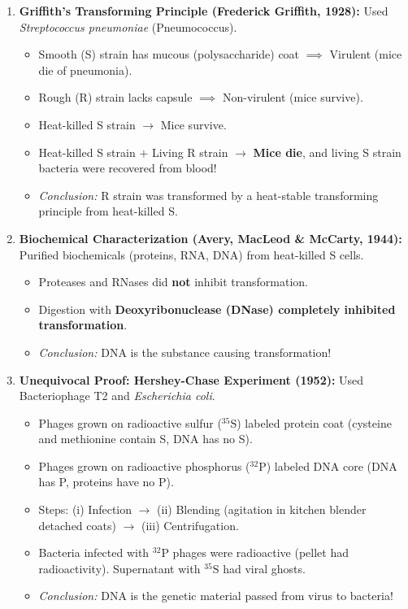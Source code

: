 \documentclass[10pt,a4paper]{article}
\begin{document}
\begin{conceptbox}
\begin{enumerate}[leftmargin=*]
  \item \textbf{Griffith's Transforming Principle (Frederick Griffith, 1928):}
  Used \textit{Streptococcus pneumoniae} (Pneumococcus).
  \begin{itemize}
    \item Smooth (S) strain has mucous (polysaccharide) coat $\implies$ Virulent (mice die of pneumonia).
    \item Rough (R) strain lacks capsule $\implies$ Non-virulent (mice survive).
    \item Heat-killed S strain $\to$ Mice survive.
    \item Heat-killed S strain $+$ Living R strain $\to$ \textbf{Mice die}, and living S strain bacteria were recovered from blood!
    \item \textit{Conclusion:} R strain was transformed by a heat-stable transforming principle from heat-killed S.
  \end{itemize}
  \item \textbf{Biochemical Characterization (Avery, MacLeod \& McCarty, 1944):}
  Purified biochemicals (proteins, RNA, DNA) from heat-killed S cells.
  \begin{itemize}
    \item Proteases and RNases did \textbf{not} inhibit transformation.
    \item Digestion with \textbf{Deoxyribonuclease (DNase) completely inhibited transformation}.
    \item \textit{Conclusion:} DNA is the substance causing transformation!
  \end{itemize}
  \item \textbf{Unequivocal Proof: Hershey-Chase Experiment (1952):}
  Used Bacteriophage T2 and \textit{Escherichia coli}.
  \begin{itemize}
    \item Phages grown on radioactive sulfur ($^{35}\mathrm{S}$) labeled protein coat (cysteine and methionine contain S, DNA has no S).
    \item Phages grown on radioactive phosphorus ($^{32}\mathrm{P}$) labeled DNA core (DNA has P, proteins have no P).
    \item Steps: (i) Infection $\to$ (ii) Blending (agitation in kitchen blender detached coats) $\to$ (iii) Centrifugation.
    \item Bacteria infected with $^{32}\mathrm{P}$ phages were radioactive (pellet had radioactivity). Supernatant with $^{35}\mathrm{S}$ had viral ghosts.
    \item \textit{Conclusion:} DNA is the genetic material passed from virus to bacteria!
  \end{itemize}
\end{enumerate}
\end{conceptbox}
\end{document}
